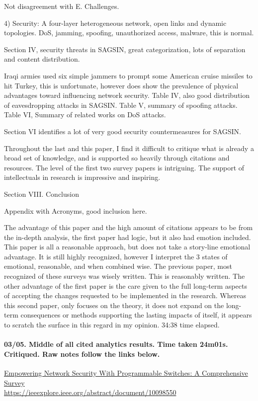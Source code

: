\documentclass{article}
\begin{document}
{Not disagreement with E. Challenges.

4) Security: A four-layer heterogeneous network, open links and dynamic topologies. DoS, jamming, spoofing, unauthorized access, malware, this is normal.

Section IV, security threats in SAGSIN, great categorization, lots of separation and content distribution.

Iraqi armies used six simple jammers to prompt some American cruise missiles to hit Turkey, this is unfortunate, however does show the prevalence of physical advantages toward influencing network security. Table IV, also good distribution of eavesdropping attacks in SAGSIN. Table V, summary of spoofing attacks. Table VI, Summary of related works on DoS attacks.

Section VI identifies a lot of very good security countermeasures for SAGSIN.

Throughout the last and this paper, I find it difficult to critique what is already a broad set of knowledge, and is supported so heavily through citations and resources. The level of the first two survey papers is intriguing. The support of intellectuals in research is impressive and inspiring.

Section VIII. Conclusion

Appendix with Acronyms, good inclusion here.

The advantage of this paper and the high amount of citations appears to be from the in-depth analysis, the first paper had logic, but it also had emotion included. This paper is all a reasonable approach, but does not take a story-line emotional advantage. It is still highly recognized, however I interpret the 3 states of emotional, reasonable, and when combined wise. The previous paper, most recognized of these surveys was wisely written. This is reasonably written. The other advantage of the first paper is the care given to the full long-term aspects of accepting the changes requested to be implemented in the research. Whereas this second paper, only focuses on the theory, it does not expand on the long-term consequences or methods supporting the lasting impacts of itself, it appears to scratch the surface in this regard in my opinion.
34:38 time elapsed.}


        \paragraph{
            \cite{chen_empowering_2023}03/05. Middle of all cited analytics results. Time taken 24m01s. Critiqued. Raw notes follow the links below.
        }
        \hfill \break
        \href{
            https://ieeexplore.ieee.org/abstract/document/10098550
        }
            {Empowering Network Security With Programmable Switches: A Comprehensive Survey}
            \\
        \url{https://ieeexplore.ieee.org/abstract/document/10098550}
        \\\\
\end{document}
